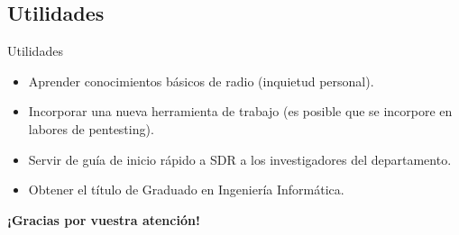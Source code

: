 \documentclass{beamer}
\begin{document}
\subsection{Utilidades}

\begin{frame}{Utilidades}

\begin{itemize}
\setlength{\itemsep}{12pt}
	\item Aprender conocimientos básicos de radio (inquietud personal).
	\item Incorporar una nueva herramienta de trabajo (es posible que se incorpore en labores de pentesting).
	\item Servir de guía de inicio rápido a SDR a los investigadores del departamento.
	\item Obtener el título de Graduado en Ingeniería Informática.
\end{itemize}

\end{frame}

\begin{frame}

\begin{center}
\textbf{¡Gracias por vuestra atención!}
\end{center}

\end{frame}
\end{document}
